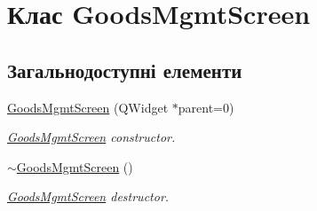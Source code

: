 \hypertarget{classGoodsMgmtScreen}{\section{Клас Goods\-Mgmt\-Screen}
\label{classGoodsMgmtScreen}
}
\subsection*{Загальнодоступні елементи}
\begin{DoxyCompactItemize}
\item 
\hyperlink{classGoodsMgmtScreen_a23df1d60103959e1b6fc32852aec9873}{Goods\-Mgmt\-Screen} (Q\-Widget $\ast$parent=0)
\begin{DoxyCompactList}\small\item\em \hyperlink{classGoodsMgmtScreen}{Goods\-Mgmt\-Screen} constructor. \end{DoxyCompactList}\item 
\hypertarget{classGoodsMgmtScreen_a0ab5666478d7b8fa00843aa127ce2a3b}{\hyperlink{classGoodsMgmtScreen_a0ab5666478d7b8fa00843aa127ce2a3b}{$\sim$\-Goods\-Mgmt\-Screen} ()}\label{classGoodsMgmtScreen_a0ab5666478d7b8fa00843aa127ce2a3b}

\begin{DoxyCompactList}\small\item\em \hyperlink{classGoodsMgmtScreen}{Goods\-Mgmt\-Screen} destructor. \end{DoxyCompactList}\end{DoxyCompactItemize}
